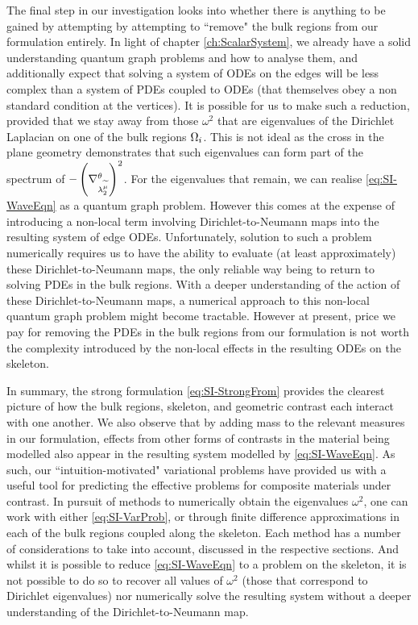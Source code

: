 The final step in our investigation looks into whether there is anything to be gained by attempting by attempting to ``remove" the bulk regions from our formulation entirely.
In light of chapter \ref{ch:ScalarSystem}, we already have a solid understanding quantum graph problems and how to analyse them, and additionally expect that solving a system of ODEs on the edges will be less complex than a system of PDEs coupled to ODEs (that themselves obey a non standard condition at the vertices).
It is possible for us to make such a reduction, provided that we stay away from those $\omega^2$ that are eigenvalues of the Dirichlet Laplacian on one of the bulk regions $\Omega_i$.
This is not ideal as the cross in the plane geometry demonstrates that such eigenvalues can form part of the spectrum of $-\left( \nabla^{\theta}_{\lambda_2^{\widetilde{\mu}}} \right)^2$.
For the eigenvalues that remain, we can realise \eqref{eq:SI-WaveEqn} as a quantum graph problem.
However this comes at the expense of introducing a non-local term involving Dirichlet-to-Neumann maps into the resulting system of edge ODEs.
Unfortunately, solution to such a problem numerically requires us to have the ability to evaluate (at least approximately) these Dirichlet-to-Neumann maps, the only reliable way being to return to solving PDEs in the bulk regions.
With a deeper understanding of the action of these Dirichlet-to-Neumann maps, a numerical approach to this non-local quantum graph problem might become tractable.
However at present, price we pay for removing the PDEs in the bulk regions from our formulation is not worth the complexity introduced by the non-local effects in the resulting ODEs on the skeleton.

In summary, the strong formulation \eqref{eq:SI-StrongFrom} provides the clearest picture of how the bulk regions, skeleton, and geometric contrast each interact with one another.
We also observe that by adding mass to the relevant measures in our formulation, effects from other forms of contrasts in the material being modelled also appear in the resulting system modelled by \eqref{eq:SI-WaveEqn}.
As such, our ``intuition-motivated" variational problems have provided us with a useful tool for predicting the effective problems for composite materials under contrast.
In pursuit of methods to numerically obtain the eigenvalues $\omega^2$, one can work with either \eqref{eq:SI-VarProb}, or through finite difference approximations in each of the bulk regions coupled along the skeleton.
Each method has a number of considerations to take into account, discussed in the respective sections.
And whilst it is possible to reduce \eqref{eq:SI-WaveEqn} to a problem on the skeleton, it is not possible to do so to recover all values of $\omega^2$ (those that correspond to Dirichlet eigenvalues) nor numerically solve the resulting system without a deeper understanding of the Dirichlet-to-Neumann map.

